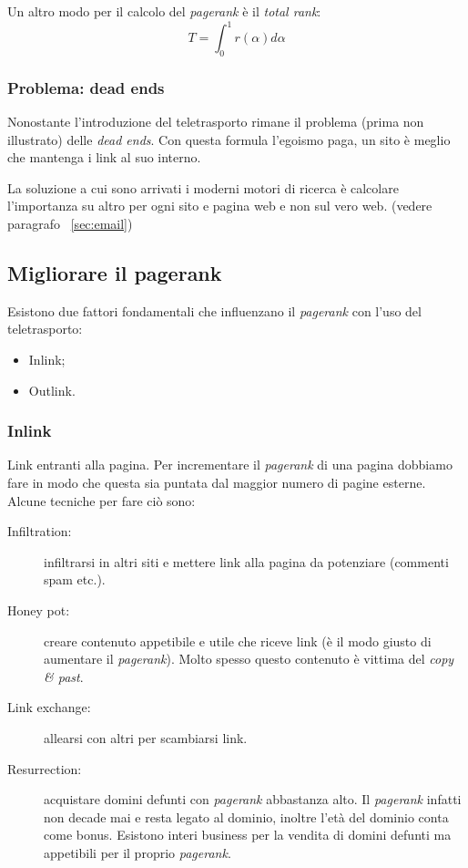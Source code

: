 			Un altro modo per il calcolo del \emph{pagerank} è il \emph{total rank}:
			\[
				T=\int_0^1r(\alpha) d\alpha
			\]
			
		
			\subsubsection{Problema: dead ends}
				Nonostante l'introduzione del teletrasporto rimane il problema (prima non illustrato) delle \emph{dead ends}. Con questa formula l'egoismo paga, un sito è meglio che mantenga i link al suo interno.
				
				La soluzione a cui sono arrivati i moderni motori di ricerca è calcolare l'importanza su altro per ogni sito e pagina web e non sul vero web. (vedere paragrafo ~\ref{sec:email})
		
		\subsection{Migliorare il pagerank}
			Esistono due fattori fondamentali che influenzano il \emph{pagerank} con l'uso del teletrasporto:
			\begin{itemize}
				\item Inlink;
				\item Outlink.
			\end{itemize}
		
			\subsubsection{Inlink}
				Link entranti alla pagina. Per incrementare il \emph{pagerank} di una pagina dobbiamo fare in modo che questa sia puntata dal maggior numero di pagine esterne. Alcune tecniche per fare ciò sono:
				\begin{description}
					\item[Infiltration:] infiltrarsi in altri siti e mettere link alla pagina da potenziare (commenti spam etc.).
					\item[Honey pot:] creare contenuto appetibile e utile che riceve link (è il modo giusto di aumentare il \emph{pagerank}). Molto spesso questo contenuto è vittima del \emph{copy \& past}.
					\item[Link exchange:] allearsi con altri per scambiarsi link.
					\item[Resurrection:] acquistare domini defunti con \emph{pagerank} abbastanza alto. Il \emph{pagerank} infatti non decade mai e resta legato al dominio, inoltre l'età del dominio conta come bonus. Esistono interi business per la vendita di domini defunti ma appetibili per il proprio \emph{pagerank}.
				\end{description}
				
